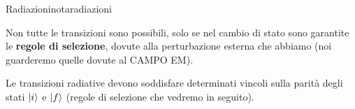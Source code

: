 \begin{note}{Radiazioni}{notaradiazioni}
\begin{center}
\end{center}

Non tutte le transizioni sono possibili, solo se nel cambio di stato sono garantite le \textbf{regole di selezione}, dovute alla perturbazione esterna che abbiamo (noi guarderemo quelle dovute al CAMPO EM).

Le transizioni radiative devono soddisfare determinati vincoli sulla parità degli stati \( \ket{i} \) e \( \ket{f} \) (regole di selezione che vedremo in seguito).
\end{note}


